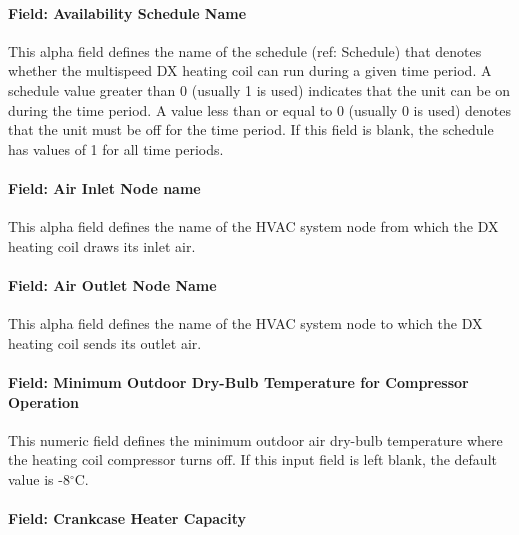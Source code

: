 \paragraph{Field: Availability Schedule Name}\label{field-availability-schedule-name-11-000}

This alpha field defines the name of the schedule (ref: Schedule) that denotes whether the multispeed DX heating coil can run during a given time period. A schedule value greater than 0 (usually 1 is used) indicates that the unit can be on during the time period. A value less than or equal to 0 (usually 0 is used) denotes that the unit must be off for the time period. If this field is blank, the schedule has values of 1 for all time periods.

\paragraph{Field: Air Inlet Node name}\label{field-air-inlet-node-name-14}

This alpha field defines the name of the HVAC system node from which the DX heating coil draws its inlet air.

\paragraph{Field: Air Outlet Node Name}\label{field-air-outlet-node-name-14}

This alpha field defines the name of the HVAC system node to which the DX heating coil sends its outlet air.

\paragraph{Field: Minimum Outdoor Dry-Bulb Temperature for Compressor Operation}\label{field-minimum-outdoor-dry-bulb-temperature-for-compressor-operation-1}

This numeric field defines the minimum outdoor air dry-bulb temperature where the heating coil compressor turns off. If this input field is left blank, the default value is -8$^\circ$C.

\paragraph{Field: Crankcase Heater Capacity}\label{field-crankcase-heater-capacity-5}

